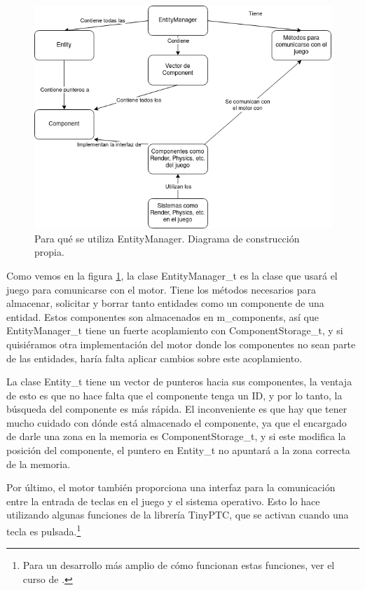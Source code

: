 \begin{figure}[H]
	\centering
	\includegraphics[width=15cm]{archivos/imagenes/Diagrama-funcionamiento-motor.png}
	\caption{Para qué se utiliza EntityManager. Diagrama de construcción propia.}
	\label{diagrama entitymanager}
\end{figure}

Como vemos en la figura \ref{diagrama entitymanager}, la clase EntityManager\_t es la clase que usará el juego para comunicarse con el motor. Tiene los métodos necesarios para almacenar, solicitar y borrar tanto entidades como un componente de una entidad. Estos componentes son almacenados en m\_components, así que EntityManager\_t tiene un fuerte acoplamiento con ComponentStorage\_t, y si quisiéramos otra implementación del motor donde los componentes no sean parte de las entidades, haría falta aplicar cambios sobre este acoplamiento.

La clase Entity\_t tiene un vector de punteros hacia sus componentes, la ventaja de esto es que no hace falta que el componente tenga un ID, y por lo tanto, la búsqueda del componente es más rápida. El inconveniente es que hay que tener mucho cuidado con dónde está almacenado el componente, ya que el encargado de darle una zona en la memoria es ComponentStorage\_t, y si este modifica la posición del componente, el puntero en Entity\_t no apuntará a la zona correcta de la memoria. 

Por último, el motor también proporciona una interfaz para la comunicación entre la entrada de teclas en el juego y el sistema operativo. Esto lo hace utilizando algunas funciones de la librería TinyPTC, que se activan cuando una tecla es pulsada.\footnote{Para un desarrollo más amplio de cómo funcionan estas funciones, ver el curso de \cite{CursoMotorC++}.}

